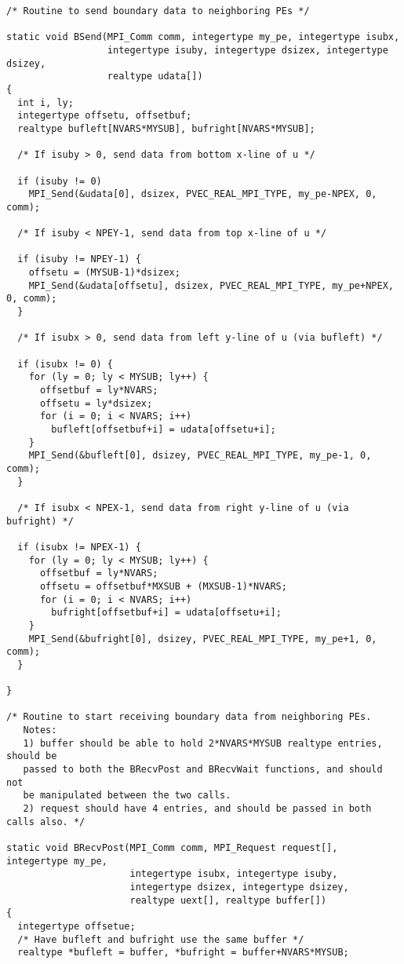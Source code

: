\begin{verbatim}
/* Routine to send boundary data to neighboring PEs */

static void BSend(MPI_Comm comm, integertype my_pe, integertype isubx,
                  integertype isuby, integertype dsizex, integertype dsizey,
                  realtype udata[])
{
  int i, ly;
  integertype offsetu, offsetbuf;
  realtype bufleft[NVARS*MYSUB], bufright[NVARS*MYSUB];

  /* If isuby > 0, send data from bottom x-line of u */

  if (isuby != 0)
    MPI_Send(&udata[0], dsizex, PVEC_REAL_MPI_TYPE, my_pe-NPEX, 0, comm);

  /* If isuby < NPEY-1, send data from top x-line of u */

  if (isuby != NPEY-1) {
    offsetu = (MYSUB-1)*dsizex;
    MPI_Send(&udata[offsetu], dsizex, PVEC_REAL_MPI_TYPE, my_pe+NPEX, 0, comm);
  }

  /* If isubx > 0, send data from left y-line of u (via bufleft) */

  if (isubx != 0) {
    for (ly = 0; ly < MYSUB; ly++) {
      offsetbuf = ly*NVARS;
      offsetu = ly*dsizex;
      for (i = 0; i < NVARS; i++)
        bufleft[offsetbuf+i] = udata[offsetu+i];
    }
    MPI_Send(&bufleft[0], dsizey, PVEC_REAL_MPI_TYPE, my_pe-1, 0, comm);   
  }

  /* If isubx < NPEX-1, send data from right y-line of u (via bufright) */

  if (isubx != NPEX-1) {
    for (ly = 0; ly < MYSUB; ly++) {
      offsetbuf = ly*NVARS;
      offsetu = offsetbuf*MXSUB + (MXSUB-1)*NVARS;
      for (i = 0; i < NVARS; i++)
        bufright[offsetbuf+i] = udata[offsetu+i];
    }
    MPI_Send(&bufright[0], dsizey, PVEC_REAL_MPI_TYPE, my_pe+1, 0, comm);   
  }

}
 
/* Routine to start receiving boundary data from neighboring PEs.
   Notes:
   1) buffer should be able to hold 2*NVARS*MYSUB realtype entries, should be
   passed to both the BRecvPost and BRecvWait functions, and should not
   be manipulated between the two calls.
   2) request should have 4 entries, and should be passed in both calls also. */

static void BRecvPost(MPI_Comm comm, MPI_Request request[], integertype my_pe,
                      integertype isubx, integertype isuby,
                      integertype dsizex, integertype dsizey,
                      realtype uext[], realtype buffer[])
{
  integertype offsetue;
  /* Have bufleft and bufright use the same buffer */
  realtype *bufleft = buffer, *bufright = buffer+NVARS*MYSUB;


\end{verbatim}
